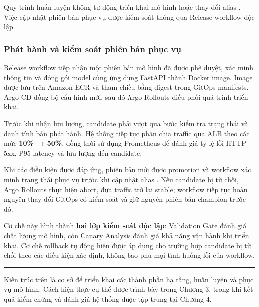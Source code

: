 Quy trình huấn luyện không tự động triển khai mô hình hoặc thay đổi alias . Việc cập nhật phiên bản phục vụ được kiểm soát thông qua Release workflow độc lập.


\subsubsection{Phát hành và kiểm soát phiên bản phục vụ}


Release workflow tiếp nhận một phiên bản mô hình đã được phê duyệt, xác minh thông tin và đóng gói model cùng ứng dụng FastAPI thành Docker image. Image được lưu trên Amazon ECR và tham chiếu bằng digest trong GitOps manifests. Argo CD đồng bộ cấu hình mới, sau đó Argo Rollouts điều phối quá trình triển khai.


Trước khi nhận lưu lượng, candidate phải vượt qua bước kiểm tra trạng thái và danh tính bản phát hành. Hệ thống tiếp tục phân chia traffic qua ALB theo các mức \textbf{10\% → 50\%}, đồng thời sử dụng Prometheus để đánh giá tỷ lệ lỗi HTTP 5xx, P95 latency và lưu lượng đến candidate.


Khi các điều kiện được đáp ứng, phiên bản mới được promotion và workflow xác minh trạng thái phục vụ trước khi cập nhật alias . Nếu candidate bị từ chối, Argo Rollouts thực hiện abort, đưa traffic trở lại stable; workflow tiếp tục hoàn nguyên thay đổi GitOps có kiểm soát và giữ nguyên phiên bản champion trước đó.


Cơ chế này hình thành \textbf{hai lớp kiểm soát độc lập}: Validation Gate đánh giá chất lượng mô hình, còn Canary Analysis đánh giá khả năng vận hành khi triển khai. Cơ chế rollback tự động hiện được áp dụng cho trường hợp candidate bị từ chối theo các điều kiện xác định, không bao phủ mọi tình huống lỗi của workflow.


\par\medskip\noindent\rule{\linewidth}{0.3pt}\par\medskip

Kiến trúc trên là cơ sở để triển khai các thành phần hạ tầng, huấn luyện và phục vụ mô hình. Cách hiện thực cụ thể được trình bày trong Chương 3, trong khi kết quả kiểm chứng và đánh giá hệ thống được tập trung tại Chương 4.

